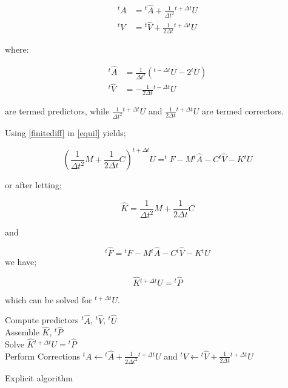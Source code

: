 \begin{equation}
\begin{aligned}
{}^tA & = {}^t\hat A + \frac{1}{{\Delta {t^2}}}{}^{t + \Delta t}U\\
{}^tV & = {}^t\hat V + \frac{1}{{2\Delta t}}{}^{t + \Delta t}U
\end{aligned}
\label{precorr}
\end{equation}

where:

\begin{equation}
\begin{aligned}
{}^t\hat A & = \frac{1}{{\Delta {t^2}}}\left( {{}^{t - \Delta t}U - 2{}^tU} \right)\\
{}^t\hat V & =  - \frac{1}{{2\Delta t}}{}^{t - \Delta t}U
\end{aligned}
\label{pred}
\end{equation}

are termed predictors, while $\frac{1}{{\Delta {t^2}}}{}^{t + \Delta t}U$ and $\frac{1}{{2\Delta t}}{}^{t + \Delta t}U$ are termed correctors.

Using \cref{finitediff} in \cref{equil} yields;


\begin{equation}
\left(\dfrac{1}{\Delta t^2}M+\dfrac{1}{2\Delta t}C\right) ^{t+\Delta t}U=^{t}F-M{}^t\hat A - C{}^t\hat V - K{}^tU
\label{resequil}
\end{equation}

or after letting;

\[\hat K = \frac{1}{{\Delta {t^2}}}M + \frac{1}{{2\Delta t}}C\]

and

\[{}^t\hat F = {}^tF - M{}^t\hat A - C{}^t\hat V - K{}^tU\] we have;

\[\hat K{}^{t + \Delta t}U = {}^t\hat P\]

which can be solved for ${}^{t + \Delta t}U$.

\begin{algorithm}[H]
\SetAlgoLined
{}
Compute predictors ${}^t\hat A$, ${}^t\hat V$, ${}^t\hat U$\\
Assemble  $\hat K$, ${}^t\hat P$\\
Solve $\hat K{}^{t + \Delta t}U = {}^t\hat P$\\
Perform Corrections ${}^tA \leftarrow {}^t\hat A + \frac{1}{{2\Delta {t^2}}}{}^{t + \Delta t}U$ and ${}^tV \leftarrow {}^t\hat V + \frac{1}{{2\Delta t}}{}^{t + \Delta t}U$
\caption{Explicit algorithm}
\end{algorithm}



